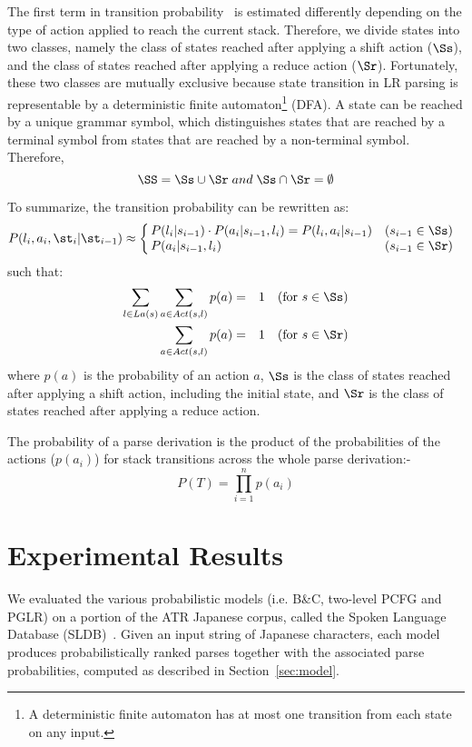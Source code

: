 The first term in transition probability~
is estimated differently depending on the type of action applied to
reach the current stack. Therefore, we divide states into two classes,
namely the class of states reached after applying a shift action
($\Ss$), and the class of states reached after applying a reduce action
($\Sr$). Fortunately, these two classes are mutually exclusive because
state transition in LR parsing is representable by a deterministic
finite automaton\footnote{A deterministic finite automaton has at most
one transition from each state on any input.} (DFA). A state can be
reached by a unique grammar symbol, which distinguishes states that are
reached by a terminal symbol from states that are reached by a
non-terminal symbol. Therefore,
\begin{equation}
  \SS = \Ss \cup \Sr\; and\; \Ss \cap \Sr = \emptyset
\end{equation}

To summarize, the transition probability can be rewritten as:
\begin{equation}
  \label{eq:pglr-act}
  P(l_i,a_i,\st_i|\st_{i-1}) \approx
  \left\{
    \begin{array}{@{\,}ll}
      P(l_i|s_{i-1}) \cdot P(a_i|s_{i-1},l_i) 
                                = P(l_i,a_i|s_{i-1}) & \mbox{$(s_{i-1}\in\Ss$})\\
      P(a_i|s_{i-1},l_i) & \mbox{$(s_{i-1}\in\Sr$})
    \end{array}
  \right.\\
\end{equation}
  such that:
  \begin{eqnarray}
    \label{eq:pglr-act1}
    \sum_{l\in La(s)}\sum_{a\in Act(s,l)} p(a) &=& 1
    \quad\mbox{(for $s\in\Ss$)}\\
    \sum_{a\in Act(s,l)} p(a) &=& 1
    \quad\mbox{(for $s\in\Sr$)}
  \end{eqnarray}
where $p(a)$ is the probability of an action $a$, $\Ss$ is the class of
states reached after applying a shift action, including the initial
state, and $\Sr$ is the class of states reached after applying a reduce
action.

The probability of a parse derivation is the product of the
probabilities of the actions ($p(a_i)$) for stack transitions across the
whole parse derivation:-
\begin{equation}
  \label{eq:pglr-tree}
  P(T) = \prod_{i=1}^n p(a_i)
\end{equation}

\section{Experimental Results}
\label{sec:experiments}
We evaluated the various probabilistic models (i.e. B\&C, two-level PCFG
and PGLR) on a portion of the ATR Japanese corpus, called the Spoken
Language Database (SLDB)~\cite{Takezawa:97}. Given an input string of
Japanese characters, each model produces probabilistically ranked parses
together with the associated parse probabilities, computed as described
in Section~\ref{sec:model}.

